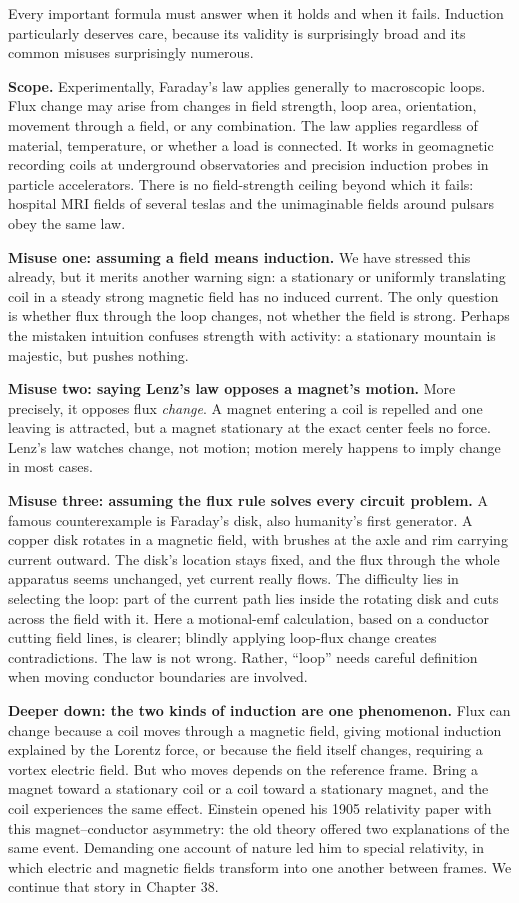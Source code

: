
Every important formula must answer when it holds and when it fails. Induction particularly deserves care, because its validity is surprisingly broad and its common misuses surprisingly numerous.

\textbf{Scope.} Experimentally, Faraday's law applies generally to macroscopic loops. Flux change may arise from changes in field strength, loop area, orientation, movement through a field, or any combination. The law applies regardless of material, temperature, or whether a load is connected. It works in geomagnetic recording coils at underground observatories and precision induction probes in particle accelerators. There is no field-strength ceiling beyond which it fails: hospital MRI fields of several teslas and the unimaginable fields around pulsars obey the same law.

\textbf{Misuse one: assuming a field means induction.} We have stressed this already, but it merits another warning sign: a stationary or uniformly translating coil in a steady strong magnetic field has no induced current. The only question is whether flux through the loop changes, not whether the field is strong. Perhaps the mistaken intuition confuses strength with activity: a stationary mountain is majestic, but pushes nothing.

\textbf{Misuse two: saying Lenz's law opposes a magnet's motion.} More precisely, it opposes flux \emph{change}. A magnet entering a coil is repelled and one leaving is attracted, but a magnet stationary at the exact center feels no force. Lenz's law watches change, not motion; motion merely happens to imply change in most cases.

\textbf{Misuse three: assuming the flux rule solves every circuit problem.} A famous counterexample is Faraday's disk, also humanity's first generator. A copper disk rotates in a magnetic field, with brushes at the axle and rim carrying current outward. The disk's location stays fixed, and the flux through the whole apparatus seems unchanged, yet current really flows. The difficulty lies in selecting the loop: part of the current path lies inside the rotating disk and cuts across the field with it. Here a motional-emf calculation, based on a conductor cutting field lines, is clearer; blindly applying loop-flux change creates contradictions. The law is not wrong. Rather, ``loop'' needs careful definition when moving conductor boundaries are involved.

\textbf{Deeper down: the two kinds of induction are one phenomenon.} Flux can change because a coil moves through a magnetic field, giving motional induction explained by the Lorentz force, or because the field itself changes, requiring a vortex electric field. But who moves depends on the reference frame. Bring a magnet toward a stationary coil or a coil toward a stationary magnet, and the coil experiences the same effect. Einstein opened his 1905 relativity paper with this magnet--conductor asymmetry: the old theory offered two explanations of the same event. Demanding one account of nature led him to special relativity, in which electric and magnetic fields transform into one another between frames. We continue that story in Chapter 38.

